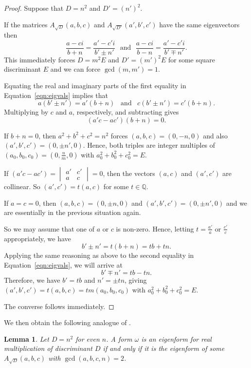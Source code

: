 \documentclass[a4paper,11pt]{amsart}
\numberwithin{equation}{section}
\numberwithin{figure}{section}
\numberwithin{table}{section}
\newtheorem{lemma}[theorem]{Lemma}
\newcommand{\Q}{\mathbb{Q}}
\begin{document}
\begin{proof}
    Suppose that $D = n^2$ and $D' = (n')^2$.
    
    If the matrices $A_{\sqrt{D}}(a,b,c)$ and $A_{\sqrt{D'}}(a',b',c')$ have the same eigenvectors then
    \begin{equation}\label{eqn:eigvals}
        \frac{a-ci}{b+n} = \frac{a'-c'i}{b'\pm n'}\,\,\,\,\text{and}\,\,\,\,\frac{a-ci}{b-n} = \frac{a'-c'i}{b'\mp n'}.
    \end{equation}
    This immediately forces $D = m^2E$ and $D' = (m')^2E$ for some square discriminant $E$ and we can force $\gcd(m,m') = 1$.

    Equating the real and imaginary parts of the first equality in Equation~\ref{eqn:eigvals} implies that
    \[a(b'\pm n') = a'(b+n)\,\,\,\,\,\text{and}\,\,\,\,\,c(b'\pm n')=c'(b+n).\]
    Multiplying by $c$ and $a$, respectively, and subtracting gives
    \[(a'c-ac')(b+n) = 0.\]

    If $b + n = 0$, then $a^2+b^2+c^2 = n^2$ forces $(a,b,c) = (0,-n,0)$ and also $(a',b',c') = (0,\pm n',0)$. Hence, both triples are integer multiples of $(a_0,b_0,c_0) = (0,\frac{n}{m},0)$ with $a_0^2+b_0^2+c_0^2 = E$.

    If $(a'c-ac') = \begin{vmatrix}
        a' & c' \\
        a & c
    \end{vmatrix} = 0$, then the vectors $(a,c)$ and $(a',c')$ are collinear. So $(a',c') = t(a,c)$ for some $t\in\Q$.
    
    If $a = c = 0$, then $(a,b,c) = (0,\pm n,0)$ and $(a',b',c') = (0,\pm n',0)$ and we are essentially in the previous situation again.
    
    So we may assume that one of $a$ or $c$ is non-zero. Hence, letting $t = \frac{a'}{a}$ or $\frac{c'}{c}$ appropriately, we have
    \[b'\pm n' = t(b+n) = tb+tn.\]
    Applying the same reasoning as above to the second equality in Equation~\ref{eqn:eigvals}, we will arrive at
    \[b'\mp n'= tb-tn.\]
    Therefore, we have $b' = tb$ and $n' = \pm tn$, giving $(a',b',c') = t(a,b,c) = tm(a_0,b_0,c_0)$ with $a_0^2+b_0^2+c_0^2 = E$.

    The converse follows immediately.
\end{proof}

We then obtain the following analogue of \cite[Lemma 5.5]{TTZ18}.

\begin{lemma}
    Let $D = n^2$ for even $n$. A form $\omega$ is an eigenform for real multiplication of discriminant $D$ if and only if it is the eigenform of some $A_{\sqrt{D}}(a,b,c)$ with $\gcd(a,b,c,n) = 2$.
\end{lemma}
\end{document}
